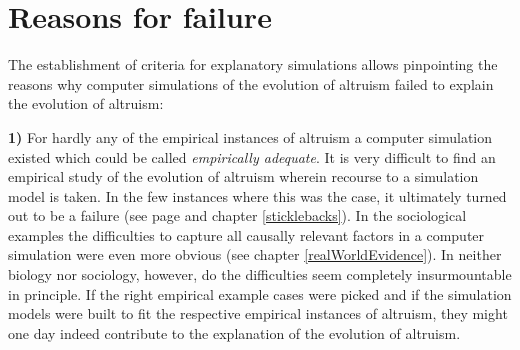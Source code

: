 \section{Reasons for failure}

The establishment of criteria for explanatory simulations allows pinpointing
the reasons why computer simulations of the evolution of altruism failed to
explain the evolution of altruism:

{\bf 1)} For hardly any of the empirical instances of altruism a computer
simulation existed which could be called {\em empirically adequate}. It is
very difficult to find an empirical study of the evolution of altruism wherein
recourse to a simulation model is taken. In the few instances where this was
the case, it ultimately turned out to be a failure (see page
\pageref{bluejays} and chapter \ref{sticklebacks}). In the sociological
examples the difficulties to capture all causally relevant factors in a
computer simulation were even more obvious (see chapter
\ref{realWorldEvidence}). In neither biology nor sociology, however, do the
difficulties seem completely insurmountable in principle. If the right
empirical example cases were picked and if the simulation models were built to
fit the respective empirical instances of altruism, they might one day indeed
contribute to the explanation of the evolution of altruism.

